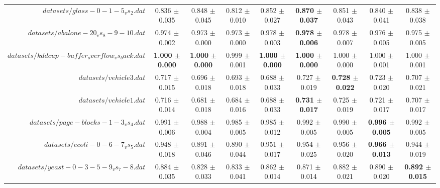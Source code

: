 \begin{table}[!ht]
{\begin{tabular}{r c c c c c c c c}
$datasets/glass-0-1-5_vs_2.dat$ & 0.836 $\pm$ 0.035 & 0.848 $\pm$ 0.045 & 0.812 $\pm$ 0.010 & 0.852 $\pm$ 0.027 & \textbf{0.870 $\pm$ 0.037} & 0.851 $\pm$ 0.043 & 0.840 $\pm$ 0.041 & 0.838 $\pm$ 0.038 \\
$datasets/abalone-20_vs_8-9-10.dat$ & 0.974 $\pm$ 0.002 & 0.973 $\pm$ 0.000 & 0.973 $\pm$ 0.000 & 0.978 $\pm$ 0.003 & \textbf{0.978 $\pm$ 0.006} & 0.978 $\pm$ 0.007 & 0.976 $\pm$ 0.005 & 0.975 $\pm$ 0.005 \\
$datasets/kddcup-buffer_overflow_vs_back.dat$ & \textbf{1.000 $\pm$ 0.000} & \textbf{1.000 $\pm$ 0.000} & 0.999 $\pm$ 0.001 & \textbf{1.000 $\pm$ 0.000} & \textbf{1.000 $\pm$ 0.000} & 1.000 $\pm$ 0.000 & 1.000 $\pm$ 0.001 & 1.000 $\pm$ 0.001 \\
$datasets/vehicle3.dat$ & 0.717 $\pm$ 0.015 & 0.696 $\pm$ 0.018 & 0.693 $\pm$ 0.018 & 0.688 $\pm$ 0.033 & 0.727 $\pm$ 0.019 & \textbf{0.728 $\pm$ 0.022} & 0.723 $\pm$ 0.020 & 0.707 $\pm$ 0.021 \\
$datasets/vehicle1.dat$ & 0.716 $\pm$ 0.014 & 0.681 $\pm$ 0.018 & 0.684 $\pm$ 0.016 & 0.688 $\pm$ 0.033 & \textbf{0.731 $\pm$ 0.017} & 0.725 $\pm$ 0.019 & 0.721 $\pm$ 0.017 & 0.707 $\pm$ 0.017 \\
$datasets/page-blocks-1-3_vs_4.dat$ & 0.991 $\pm$ 0.006 & 0.988 $\pm$ 0.004 & 0.985 $\pm$ 0.005 & 0.985 $\pm$ 0.012 & 0.992 $\pm$ 0.005 & 0.990 $\pm$ 0.005 & \textbf{0.996 $\pm$ 0.005} & 0.992 $\pm$ 0.005 \\
$datasets/ecoli-0-6-7_vs_5.dat$ & 0.948 $\pm$ 0.018 & 0.891 $\pm$ 0.046 & 0.890 $\pm$ 0.044 & 0.951 $\pm$ 0.017 & 0.954 $\pm$ 0.025 & 0.956 $\pm$ 0.020 & \textbf{0.966 $\pm$ 0.013} & 0.944 $\pm$ 0.019 \\
$datasets/yeast-0-3-5-9_vs_7-8.dat$ & 0.884 $\pm$ 0.035 & 0.828 $\pm$ 0.033 & 0.833 $\pm$ 0.041 & 0.862 $\pm$ 0.014 & 0.871 $\pm$ 0.014 & 0.882 $\pm$ 0.021 & 0.890 $\pm$ 0.020 & \textbf{0.892 $\pm$ 0.015} \\
\end{tabular}}
\end{table}
